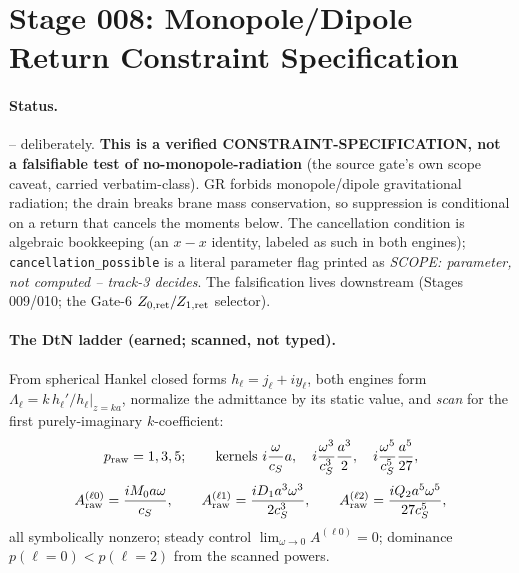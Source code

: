 \section{Stage 008: Monopole/Dipole Return Constraint Specification}

\claimstatus{\StatusOpen}

\paragraph{Status.}
\StatusOpen{} -- deliberately. \textbf{This is a verified
CONSTRAINT-SPECIFICATION, not a falsifiable test of no-monopole-radiation}
(the source gate's own scope caveat, carried verbatim-class). GR forbids
monopole/dipole gravitational radiation; the drain breaks brane mass
conservation, so suppression is conditional on a return that cancels the
moments below. The cancellation condition is algebraic bookkeeping (an
\(x-x\) identity, labeled as such in both engines);
\texttt{cancellation\_possible} is a literal parameter flag printed as
\emph{SCOPE: parameter, not computed -- track-3 decides}. The falsification
lives downstream (Stages 009/010; the Gate-6 \(Z_{0,\rm ret}/Z_{1,\rm ret}\)
selector).

\paragraph{The DtN ladder (earned; scanned, not typed).}
From spherical Hankel closed forms \(h_\ell=j_\ell+iy_\ell\), both engines
form \(\Lambda_\ell = k\,h_\ell'/h_\ell|_{z=ka}\), normalize the admittance by
its static value, and \emph{scan} for the first purely-imaginary
\(k\)-coefficient:
\[
  p_{\rm raw}=1,3,5;\qquad
  \text{kernels } i\frac{\omega}{c_S}a,\quad
  i\frac{\omega^3}{c_S^3}\frac{a^3}{2},\quad
  i\frac{\omega^5}{c_S^5}\frac{a^5}{27},
\]
\[
  A_{\rm raw}^{(\ell 0)}=\frac{iM_0 a\omega}{c_S},\qquad
  A_{\rm raw}^{(\ell 1)}=\frac{iD_1 a^3\omega^3}{2c_S^3},\qquad
  A_{\rm raw}^{(\ell 2)}=\frac{iQ_2 a^5\omega^5}{27c_S^5},
\]
all symbolically nonzero; steady control \(\lim_{\omega\to0}A^{(\ell0)}=0\);
dominance \(p(\ell{=}0)<p(\ell{=}2)\) from the scanned powers.

